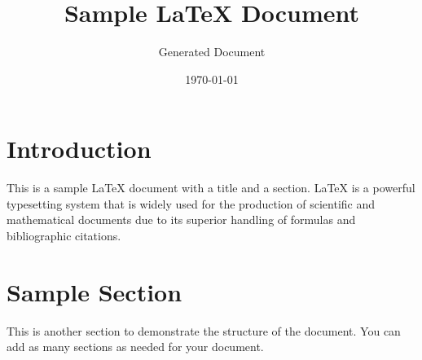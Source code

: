 \documentclass{article}
\title{Sample LaTeX Document}
\author{Generated Document}
\date{\today}
\begin{document}
\maketitle

\section{Introduction}
This is a sample LaTeX document with a title and a section. LaTeX is a powerful typesetting system that is widely used for the production of scientific and mathematical documents due to its superior handling of formulas and bibliographic citations.

\section{Sample Section}
This is another section to demonstrate the structure of the document. You can add as many sections as needed for your document.
\end{document}
